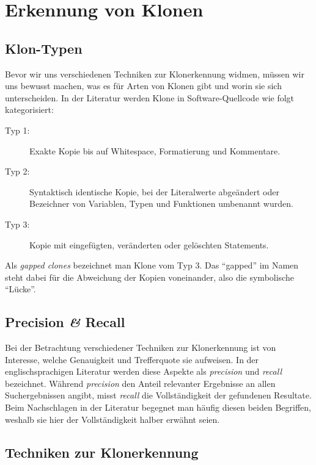 \section{Erkennung von Klonen}

\subsection{Klon-Typen} \label{sec:clonetypes}

Bevor wir uns verschiedenen Techniken zur Klonerkennung widmen, müssen wir uns bewusst machen, was es für Arten von Klonen gibt und worin sie sich unterscheiden. In der Literatur \cite{koschke2007survey} werden Klone in Software-Quellcode wie folgt kategorisiert:

\begin{description}
  \item[Typ 1:]
  Exakte Kopie bis auf Whitespace, Formatierung und Kommentare.
  \item[Typ 2:]
  Syntaktisch identische Kopie, bei der Literalwerte abgeändert oder Bezeichner von Variablen, Typen und Funktionen umbenannt wurden.
  \item[Typ 3:]
  Kopie mit eingefügten, veränderten oder gelöschten Statements.
\end{description}

Als \textit{gapped clones} bezeichnet man Klone vom Typ 3. Das \enquote{gapped} im Namen steht dabei für die Abweichung der Kopien voneinander, also die symbolische \enquote{Lücke}.


\subsection{Precision \textit{\&} Recall}

Bei der Betrachtung verschiedener Techniken zur Klonerkennung ist von Interesse, welche Genauigkeit und Trefferquote sie aufweisen. In der englischsprachigen Literatur werden diese Aspekte als \textit{precision} und \textit{recall} bezeichnet. Während \textit{precision} den Anteil relevanter Ergebnisse an allen Suchergebnissen angibt, misst \textit{recall} die Vollständigkeit der gefundenen Resultate. Beim Nachschlagen in der Literatur begegnet man häufig diesen beiden Begriffen, weshalb sie hier der Vollständigkeit halber erwähnt seien.


\subsection{Techniken zur Klonerkennung}

